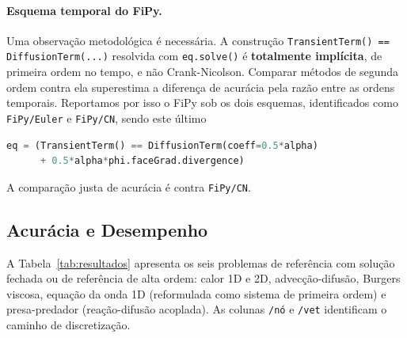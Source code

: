 \documentclass[10pt,brazil,english]{article}
\begin{document}
\paragraph{Esquema temporal do FiPy.}
Uma observação metodológica é necessária. A construção \texttt{TransientTerm() == DiffusionTerm(...)} resolvida com \texttt{eq.solve()} é \textbf{totalmente implícita}, de primeira ordem no tempo, e não Crank-Nicolson. Comparar métodos de segunda ordem contra ela superestima a diferença de acurácia pela razão entre as ordens temporais. Reportamos por isso o FiPy sob os dois esquemas, identificados como \texttt{FiPy/Euler} e \texttt{FiPy/CN}, sendo este último
\begin{lstlisting}[language=Python, showstringspaces=false]
eq = (TransientTerm() == DiffusionTerm(coeff=0.5*alpha)
      + 0.5*alpha*phi.faceGrad.divergence)
\end{lstlisting}
A comparação justa de acurácia é contra \texttt{FiPy/CN}.

\subsection{Acurácia e Desempenho}

A Tabela~\ref{tab:resultados} apresenta os seis problemas de referência com solução fechada ou de referência de alta ordem: calor 1D e 2D, advecção-difusão, Burgers viscosa, equação da onda 1D (reformulada como sistema de primeira ordem) e presa-predador (reação-difusão acoplada). As colunas \texttt{/nó} e \texttt{/vet} identificam o caminho de discretização.
\end{document}
